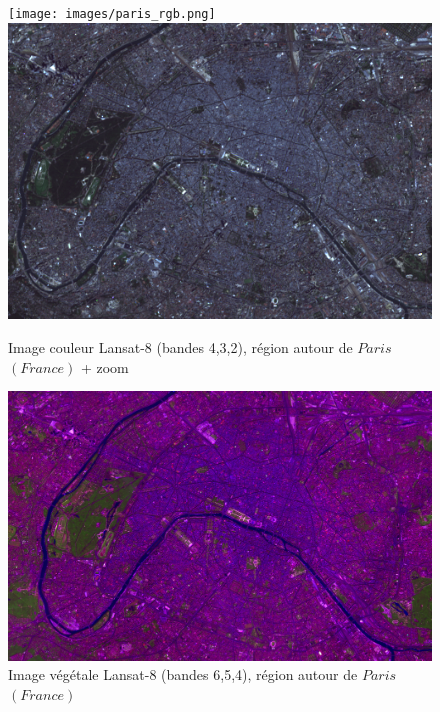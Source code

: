 \documentclass{book}
\begin{document}
\begin{figure}[H]
\begin{center}
\texttt{[image: images/paris\_rgb.png]}
\includegraphics[scale=0.5]{images/paris_rgb_zoom.png}
\end{center}
\caption{Image couleur Lansat-8 (bandes 4,3,2), région autour de $Paris$ $(France)$ + zoom}
\label{color}
\end{figure}


\begin{figure}[H]
\begin{center}
\includegraphics[scale=0.3]{images/paris_vegetal_zoom_pansharpened.png}
\end{center}
\caption{Image végétale Lansat-8 (bandes 6,5,4), région autour de $Paris$ $(France)$}
\label{vegetation}
\end{figure}

\clearpage
\end{document}
